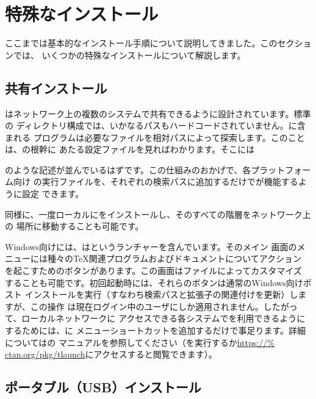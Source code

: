 \documentclass[uplatex,dvipdfmx,12pt,tombow]{jsarticle}
\begin{document}
\section{特殊なインストール}

ここまでは基本的なインストール手順について説明してきました。このセクションでは、
いくつかの特殊なインストールについて解説します。

\subsection{共有インストール}
\label{sec:sharedinstall}

\TL はネットワーク上の複数のシステムで共有できるように設計されています。標準の
ディレクトリ構成では、いかなるパスもハードコードされていません。\TL に含まれる
プログラムは必要なファイルを相対パスによって探索します。このことは、\TL の根幹に
あたる設定ファイルを見ればわかります。そこには
%
%
のような記述が並んでいるはずです。この仕組みのおかげで、各プラットフォーム向け
の実行ファイルを、それぞれの検索パスに追加するだけで\TL が機能するように設定
できます。

同様に、一度ローカルに\TL をインストールし、そのすべての階層をネットワーク上の
場所に移動することも可能です。

Windows向けには、\TL はというランチャーを含んでいます。そのメイン
画面のメニューには種々の\TeX 関連プログラムおよびドキュメントについてアクション
を起こすためのボタンがあります。この画面はファイルによってカスタマイズ
することも可能です。初回起動時には、それらのボタンは通常のWindows向けポスト
インストールを実行（すなわち検索パスと拡張子の関連付けを更新）しますが、この操作
は現在ログイン中のユーザにしか適用されません。したがって、ローカルネットワークに
アクセスできる各システムで\TL を利用できるようにするためには、に
メニューショートカットを追加するだけで事足ります。詳細についてはの
マニュアルを参照してください（を実行するか\url{https://%
ctan.org/pkg/tlaunch}にアクセスすると閲覧できます）。

\subsection{ポータブル（USB）インストール}
\label{sec:portable-tl}
\end{document}
